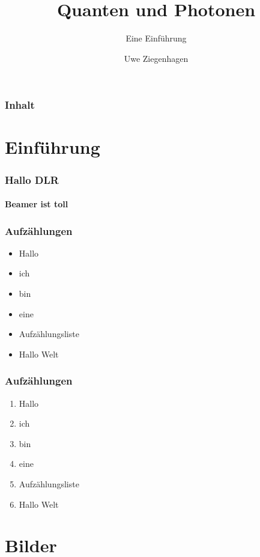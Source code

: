 \documentclass{beamer}
\title{Quanten und Photonen}
\subtitle{Eine Einführung}
\author{Uwe Ziegenhagen}
\institute{DLR}
\begin{document}
\begin{frame}
\maketitle
\end{frame}

\begin{frame}
\frametitle{Inhalt}

\tableofcontents


\end{frame}

\section{Einführung}

\begin{frame}[allowframebreaks]
\frametitle{Hallo DLR}
\framesubtitle{Beamer ist toll}

\blindtext[2]

\end{frame}

\begin{frame}
\frametitle{Aufzählungen}

\begin{itemize}
\item Hallo
\item ich 
\item bin 
\item eine 
\item Aufzählungsliste
\item Hallo Welt
\end{itemize}
\end{frame}

\begin{frame}
\frametitle{Aufzählungen}

\begin{enumerate}[I]
\item Hallo
\item ich 
\item bin 
\item eine 
\item Aufzählungsliste
\item Hallo Welt
\end{enumerate}
\end{frame}

\section{Bilder}
\end{document}
